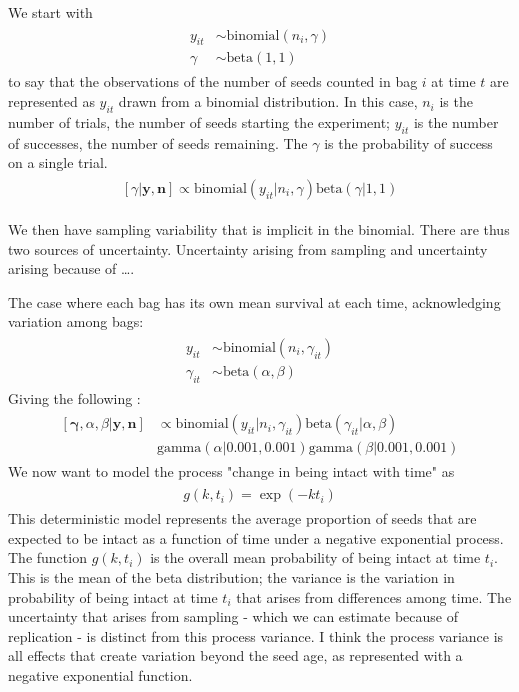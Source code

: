 \documentclass[12pt, oneside, titlepage]{article}   	%
\begin{document}
\doublespace


We start with
%
\begin{align}
  \begin{split}
y_{it} &\sim \mathrm{binomial}(n_i, \gamma) 
\\ \gamma & \sim \mathrm{beta}(1,1)
  \end{split}
\end{align}
% 
to say that the observations of the number of seeds counted in bag $i$ at time $t$ are represented as $y_{it}$ drawn from a binomial distribution. In this case, $n_i$ is the number of trials, the number of seeds starting the experiment; $y_{it}$ is the number of successes, the number of seeds remaining. The $\gamma$ is the probability of success on a single trial.
%
\begin{align}
  \begin{split}
[\gamma | \bm{y}, \bm{n} ] \propto \mathrm{binomial}(y_{it} | n_i, \gamma) \mathrm{beta}(\gamma | 1,1)
  \end{split}
\end{align}
%

We then have sampling variability that is implicit in the binomial. There are thus two sources of uncertainty. Uncertainty arising from sampling and uncertainty arising because of \dots. 

The case where each bag has its own mean survival at each time, acknowledging variation among bags:
%
\begin{align}
  \begin{split}
y_{it} &\sim \mathrm{binomial}(n_i, \gamma_{it}) 
\\ \gamma_{it} & \sim \mathrm{beta}(\alpha,\beta)
  \end{split}
\end{align}
% 
Giving the following :
%
\begin{align}
  \begin{split}
[\bm{\gamma}, \alpha, \beta | \bm{y}, \bm{n} ] & \propto \mathrm{binomial}(y_{it} | n_i, \gamma_{it}) \mathrm{beta}(\gamma _{it}| \alpha, \beta) 
\\ & \mathrm{gamma}( \alpha | 0.001, 0.001) \mathrm{gamma}( \beta | 0.001, 0.001)
  \end{split}
\end{align}
%
We now want to model the process "change in being intact with time" as 
%
\begin{align}
  \begin{split}
g(k,t_i) = \exp(-k t_i)
  \end{split}
\end{align}
% 
This deterministic model represents the average proportion of seeds that are expected to be intact as a function of time under a negative exponential process. The function $g(k,t_i)$ is the overall mean probability of being intact at time $t_i$. This is the mean of the beta distribution; the variance is the variation in probability of being intact at time $t_i$ that arises from differences among time. The uncertainty that arises from sampling - which we can estimate because of replication - is distinct from this process variance. I think the process variance is all effects that create variation beyond the seed age, as represented with a negative exponential function.
\end{document}
